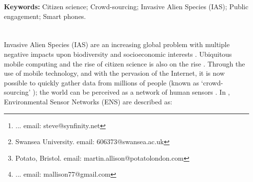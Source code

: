 \documentclass[10pt,psfig,letterpaper,twocolumn]{article}
\begin{document}
% 
%


\title{}
\author{
{}\thanks{... email: steve@synfinity.net }, \and
{}\thanks{Swansea University. email: 606373@swansea.ac.uk}, \and 
{}\thanks{Potato, Bristol. email: martin.allison@potatolondon.com}, \and
{}\thanks{... email: mallison77@gmail.com}\\
}
\date{}
\maketitle
\thispagestyle{empty}
\begin{abstract}
Invasive Alien Species (IAS) are a growing global problem, reducing biodiversity and causing significant negative socioeconomic impacts. Management and control is hampered by a lack of accessible data of adequate spatial and temporal resolution. Smart phone technology and cheap access to data networks may enable crowd-sourcing of IAS data to bridge the `data gap'. By engaging the general public in `citizen science', IAS-ESS (iAssess) aims to provide much-needed, real-time data to scientists.
\end{abstract}
{\bf Keywords:}
Citizen science; Crowd-sourcing; Invasive Alien Species (IAS);  Public engagement; Smart phones.
\section*{}

Invasive Alien Species (IAS) are an increasing global problem with multiple negative impacts upon biodiversity and socioeconomic interests \cite{Pimentel:2005p4121, Vila:2011ft, Vitousek:1997p78}. Ubiquitous mobile computing and the rise of  citizen science is also on the rise \cite{Silvertown:2009tw}. Through the use of mobile technology, and with the pervasion of the Internet, it is now possible to quickly gather data from millions of people (known as `crowd-sourcing' \cite{Wired:2011uj}); the world can be perceived as a network of human sensors \cite{Goodchild:2007vt}. In \citet{Hart:2006uz}, Environmental Sensor Networks (ENS) are described as:
\end{document}
